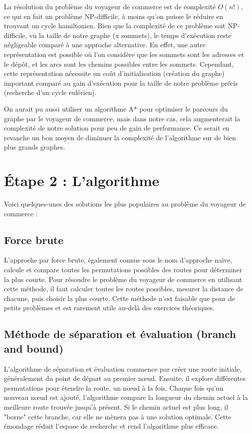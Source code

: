 \documentclass{article}
\begin{document}
La résolution du problème du voyageur de commerce est de complexité $O(n!)$, ce qui en fait un problème NP-difficile, à moins qu'on puisse le réduire en trouvant un cycle hamiltonien.
Bien que la complexité de ce problème soit NP-difficile, vu la taille de notre graphe (x sommets), le temps d'exécution reste négligeable comparé à une approche alternative.
En effet, une autre représentation est possible où l'on considère que les sommets sont les adresses et le dépôt, et les arcs sont les chemins possibles entre les sommets.
Cependant, cette représentation nécessite un coût d'initialisation (création du graphe) important comparé au gain d'exécution pour la taille de notre problème précis (recherche d'un cycle eulérien).

On aurait pu aussi utiliser un algorithme A* pour optimiser le parcours du graphe par le voyageur de commerce, mais dans notre cas, cela augmenterait la complexité de notre solution pour peu de gain de performance.
Ce serait en revanche un bon moyen de diminuer la complexité de l'algorithme sur de bien plus grands graphes.

\section{Étape 2 : L’algorithme}

Voici quelques-unes des solutions les plus populaires au problème du voyageur de commerce :

\subsection{Force brute}

L'approche par force brute, également connue sous le nom d'approche naïve, calcule et compare toutes les permutations possibles des routes pour déterminer la plus courte.
Pour résoudre le problème du voyageur de commerce en utilisant cette méthode, il faut calculer toutes les routes possibles, mesurer la distance de chacune, puis choisir la plus courte.
Cette méthode n'est faisable que pour de petits problèmes et est rarement utile au-delà des exercices théoriques.

\subsection{Méthode de séparation et évaluation (branch and bound)}

L'algorithme de séparation et évaluation commence par créer une route initiale, généralement du point de départ au premier nœud.
Ensuite, il explore différentes permutations pour étendre la route, un nœud à la fois.
Chaque fois qu'un nouveau nœud est ajouté, l'algorithme compare la longueur du chemin actuel à la meilleure route trouvée jusqu'à présent.
Si le chemin actuel est plus long, il "borne" cette branche, car elle ne mènera pas à une solution optimale.
Cette émondage réduit l'espace de recherche et rend l'algorithme plus efficace.
\end{document}
